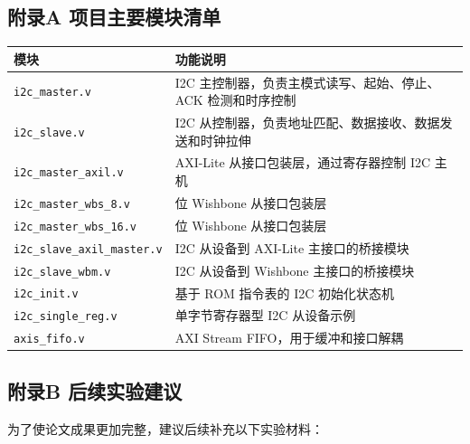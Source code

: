 \subsection{附录A 项目主要模块清单}\label{ux9644ux5f55a-ux9879ux76eeux4e3bux8981ux6a21ux5757ux6e05ux5355}

{\def\LTcaptype{none} %
\begin{longtable}[]{@{}
  >{\raggedright\arraybackslash}p{}
  >{\raggedright\arraybackslash}p{}@{}}
\toprule\noalign{}
\begin{minipage}[b]{\linewidth}\raggedright
模块
\end{minipage} & \begin{minipage}[b]{\linewidth}\raggedright
功能说明
\end{minipage} \\
\midrule\noalign{}
\endhead
\bottomrule\noalign{}
\endlastfoot
\texttt{i2c\_master.v} & I2C 主控制器，负责主模式读写、起始、停止、ACK 检测和时序控制 \\
\texttt{i2c\_slave.v} & I2C 从控制器，负责地址匹配、数据接收、数据发送和时钟拉伸 \\
\texttt{i2c\_master\_axil.v} & AXI-Lite 从接口包装层，通过寄存器控制 I2C 主机 \\
\texttt{i2c\_master\_wbs\_8.v} & 8 位 Wishbone 从接口包装层 \\
\texttt{i2c\_master\_wbs\_16.v} & 16 位 Wishbone 从接口包装层 \\
\texttt{i2c\_slave\_axil\_master.v} & I2C 从设备到 AXI-Lite 主接口的桥接模块 \\
\texttt{i2c\_slave\_wbm.v} & I2C 从设备到 Wishbone 主接口的桥接模块 \\
\texttt{i2c\_init.v} & 基于 ROM 指令表的 I2C 初始化状态机 \\
\texttt{i2c\_single\_reg.v} & 单字节寄存器型 I2C 从设备示例 \\
\texttt{axis\_fifo.v} & AXI Stream FIFO，用于缓冲和接口解耦 \\
\end{longtable}
}

\subsection{附录B 后续实验建议}\label{ux9644ux5f55b-ux540eux7eedux5b9eux9a8cux5efaux8bae}

为了使论文成果更加完整，建议后续补充以下实验材料：

